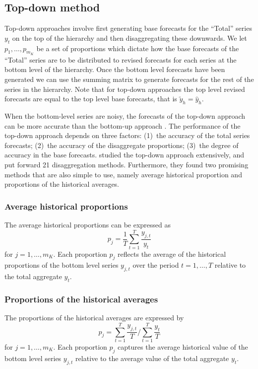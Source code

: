 \documentclass[nojss]{jss}
\begin{document}
\subsection*{Top-down method}

Top-down approaches involve first generating base forecasts for the ``Total'' series $y_t$ on the top of the hierarchy and then disaggregating these downwards. We let
$
  p_1,\ldots,p_{m_K}
$
be a set of proportions which dictate how the base forecasts of the ``Total'' series are to be distributed to revised forecasts for each series at the bottom level of the hierarchy. Once the bottom level forecasts have been generated we can use the summing matrix to generate forecasts for the rest of the series in the hierarchy. Note that for top-down approaches the top level revised forecasts are equal to the top level base forecasts, that is $\tilde{y}_{h}=\hat{y}_{h}$.

When the bottom-level series are noisy, the forecasts of the top-down approach can be more accurate than the bottom-up approach \citep{GG60, Fliedner99}. The performance of the top-down approach depends on three factors: (1)~the accuracy of the total series forecasts; (2)~the accuracy of the disaggregate proportions; (3)~the degree of accuracy in the base forecasts. \cite{GS90} studied the top-down approach extensively, and put forward 21 disaggregation methods. Furthermore, they found two promising methods that are also simple to use, namely average historical proportion and proportions of the historical averages.

\subsubsection{Average historical proportions }
The average historical proportions can be expressed as
\[
  p_j=\frac{1}{T}\sum_{t=1}^{T}\frac{y_{j,t}}{{y_t}}
\]
for $j=1,\dots,m_K$. Each proportion $p_j$ reflects the average of the historical proportions of the bottom level series $y_{j,t}$ over the period $t=1,\dots,T$ relative to the total aggregate $y_t$.

\subsubsection{Proportions of the historical averages}
The proportions of the historical averages are expressed by
$$
  p_j={\sum_{t=1}^{T}\frac{y_{j,t}}{T}}\Big/{\sum_{t=1}^{T}\frac{y_t}{T}}
$$
for $j=1,\dots,m_K$. Each proportion $p_j$ captures the average historical value of the bottom level series $y_{j,t}$ relative to the average value of the total aggregate $y_t$.
\end{document}
